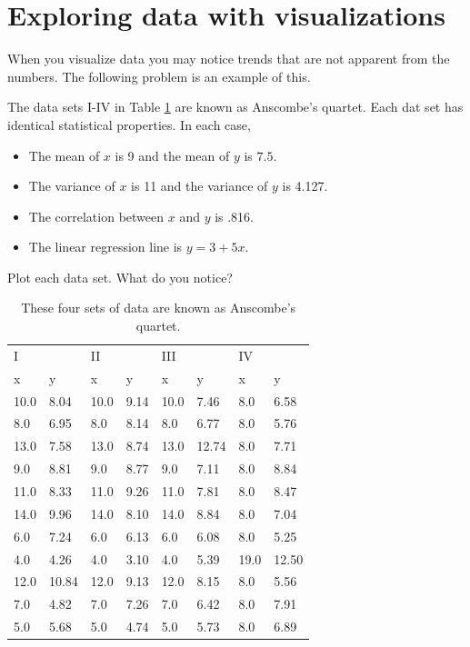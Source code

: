 \section*{Exploring data with visualizations}
When you visualize data you may notice trends that are not apparent from the numbers. 
The following problem is an example of this.

\begin{problem}\label{prob:anscombe}
The data sets I-IV in Table \ref{table:anscombe} are known as Anscombe's quartet. 
Each dat set has identical statistical properties. 
In each case,
\begin{itemize}
\item The mean of $x$ is 9 and the mean of $y$ is $7.5$.
\item The variance of $x$ is 11 and the variance of $y$ is 4.127.
\item The correlation between $x$ and $y$ is .816.
\item The linear regression line is $y=3+5x$.
\end{itemize}
Plot each data set. What do you notice?

\begin{table}[H]
\begin{tabular}{l l  |  l l  |  l l  |  l l }
I & & II & & III & & IV\\
x & y & x & y & x & y & x & y \\
\hline
10.0 & 8.04 & 10.0 & 9.14 & 10.0 & 7.46 & 8.0 & 6.58 \\
8.0 & 6.95 & 8.0 & 8.14 & 8.0 & 6.77 & 8.0 & 5.76 \\
13.0 & 7.58 & 13.0 & 8.74 & 13.0 & 12.74 & 8.0 & 7.71 \\
9.0 & 8.81 & 9.0 & 8.77 & 9.0 & 7.11 & 8.0 & 8.84 \\
11.0 & 8.33 & 11.0 & 9.26 & 11.0 & 7.81 & 8.0 & 8.47 \\
14.0 & 9.96 & 14.0 & 8.10 & 14.0 & 8.84 & 8.0 & 7.04 \\
6.0 & 7.24 & 6.0 & 6.13 & 6.0 & 6.08 & 8.0 & 5.25 \\
4.0 & 4.26 & 4.0 & 3.10 & 4.0 & 5.39 & 19.0 & 12.50 \\
12.0 & 10.84 & 12.0 & 9.13 & 12.0 & 8.15 & 8.0 & 5.56 \\
7.0 & 4.82 & 7.0 & 7.26 & 7.0 & 6.42 & 8.0 & 7.91 \\
5.0 & 5.68 & 5.0 & 4.74 & 5.0 & 5.73 & 8.0 & 6.89 \\
\end{tabular}
\caption{These four sets of data are known as Anscombe's quartet.}
\label{table:anscombe}
\end{table}
\end{problem}

